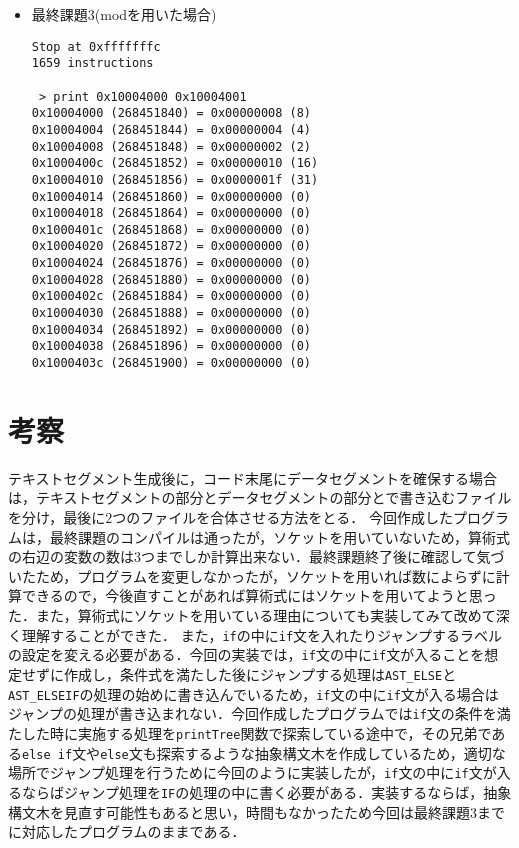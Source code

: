 \documentclass{jarticle}[11pt]
\begin{document}
\begin{itemize}
\item 最終課題$3$(modを用いた場合)
\begin{verbatim}
Stop at 0xfffffffc
1659 instructions

 > print 0x10004000 0x10004001
0x10004000 (268451840) = 0x00000008 (8)
0x10004004 (268451844) = 0x00000004 (4)
0x10004008 (268451848) = 0x00000002 (2)
0x1000400c (268451852) = 0x00000010 (16)
0x10004010 (268451856) = 0x0000001f (31)
0x10004014 (268451860) = 0x00000000 (0)
0x10004018 (268451864) = 0x00000000 (0)
0x1000401c (268451868) = 0x00000000 (0)
0x10004020 (268451872) = 0x00000000 (0)
0x10004024 (268451876) = 0x00000000 (0)
0x10004028 (268451880) = 0x00000000 (0)
0x1000402c (268451884) = 0x00000000 (0)
0x10004030 (268451888) = 0x00000000 (0)
0x10004034 (268451892) = 0x00000000 (0)
0x10004038 (268451896) = 0x00000000 (0)
0x1000403c (268451900) = 0x00000000 (0)
\end{verbatim}
\end{itemize}

\section{考察}
テキストセグメント生成後に，コード末尾にデータセグメントを確保する場合は，テキストセグメントの部分とデータセグメントの部分とで書き込むファイルを分け，最後に$2$つのファイルを合体させる方法をとる．
今回作成したプログラムは，最終課題のコンパイルは通ったが，ソケットを用いていないため，算術式の右辺の変数の数は$3$つまでしか計算出来ない．最終課題終了後に確認して気づいたため，プログラムを変更しなかったが，ソケットを用いれば数によらずに計算できるので，今後直すことがあれば算術式にはソケットを用いてようと思った．また，算術式にソケットを用いている理由についても実装してみて改めて深く理解することができた．
また，\verb|if|の中に\verb|if|文を入れたりジャンプするラベルの設定を変える必要がある．今回の実装では，\verb|if|文の中に\verb|if|文が入ることを想定せずに作成し，条件式を満たした後にジャンプする処理は\verb|AST_ELSE|と\verb|AST_ELSEIF|の処理の始めに書き込んでいるため，\verb|if|文の中に\verb|if|文が入る場合はジャンプの処理が書き込まれない．今回作成したプログラムでは\verb|if|文の条件を満たした時に実施する処理を\verb|printTree|関数で探索している途中で，その兄弟である\verb|else if|文や\verb|else|文も探索するような抽象構文木を作成しているため，適切な場所でジャンプ処理を行うために今回のように実装したが，\verb|if|文の中に\verb|if|文が入るならばジャンプ処理を\verb|IF|の処理の中に書く必要がある．実装するならば，抽象構文木を見直す可能性もあると思い，時間もなかったため今回は最終課題$3$までに対応したプログラムのままである．
\end{document}
